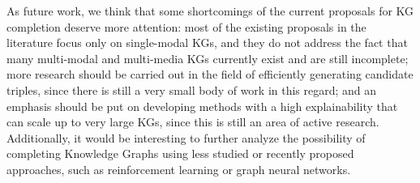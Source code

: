As future work, we think that some shortcomings of the current proposals for KG completion deserve more attention: most of the existing proposals in the literature focus only on single-modal KGs, and they do not address the fact that many multi-modal and multi-media KGs currently exist and are still incomplete; more research should be carried out in the field of efficiently generating candidate triples, since there is still a very small body of work in this regard; and an emphasis should be put on developing methods with a high explainability that can scale up to very large KGs, since this is still an area of active research. Additionally, it would be interesting to further analyze the possibility of completing Knowledge Graphs using less studied or recently proposed approaches, such as reinforcement learning or graph neural networks.